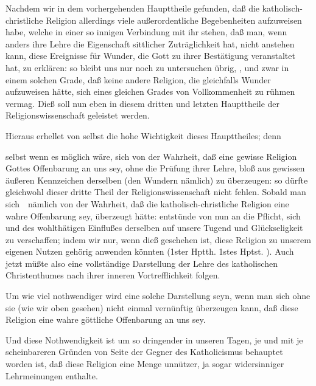 \clearpage\linenumbers%
\def\dieserteilseiten{IIIa}
\begin{aufza}
\item Nachdem wir in dem vorhergehenden Haupttheile gefunden, daß die katholisch-christliche Religion allerdings viele außerordentliche Begebenheiten aufzuweisen habe, welche in einer so innigen Verbindung mit ihr stehen, daß man, wenn anders ihre Lehre die Eigenschaft sittlicher Zuträglichkeit hat, nicht anstehen kann, diese Ereignisse für Wunder, die Gott zu ihrer Bestätigung veranstaltet hat, zu erklären: so bleibt uns nur noch zu untersuchen übrig, , und zwar in einem solchen Grade, daß keine andere Religion, die gleichfalls Wunder aufzuweisen hätte, sich eines gleichen Grades von Vollkommenheit zu rühmen vermag. Dieß soll nun eben in diesem dritten und letzten Haupttheile der Religionswissenschaft geleistet werden.
\item Hieraus erhellet von selbst die hohe Wichtigkeit dieses Haupttheiles; denn
\begin{aufzb}
\item selbst wenn es möglich wäre, sich von der Wahrheit, daß eine gewisse Religion Gottes Offenbarung an uns sey, ohne die Prüfung ihrer Lehre, bloß aus gewissen äußeren Kennzeichen derselben (den Wundern nämlich) zu überzeugen: so dürfte gleichwohl dieser dritte Theil der Religionswissenschaft nicht fehlen. Sobald man sich~\ nämlich von der Wahrheit, daß die katholisch-christliche Religion eine wahre Offenbarung sey, überzeugt hätte: entstünde von nun an die Pflicht, sich   und des wohlthätigen Einflußes derselben auf unsere Tugend und Glückseligkeit zu verschaffen; indem wir nur, wenn dieß geschehen ist, diese Religion zu unserem eigenen Nutzen gehörig anwenden könnten (1ster Hptth. 1stes Hptst. ). Auch jetzt müßte also eine vollständige Darstellung der Lehre des katholischen Christenthumes nach ihrer inneren Vortrefflichkeit folgen.
\item Um wie viel nothwendiger wird eine solche Darstellung seyn, wenn man sich ohne sie (wie wir oben gesehen) nicht einmal vernünftig überzeugen kann, daß diese Religion eine wahre göttliche Offenbarung an uns sey.
\item Und diese Nothwendigkeit ist um so dringender in unseren Tagen, je  und mit je scheinbareren Gründen von Seite der Gegner des Katholicismus behauptet worden ist, daß diese Religion eine Menge unnützer, ja sogar widersinniger Lehrmeinungen enthalte.
\end{aufzb}
\end{aufza}


